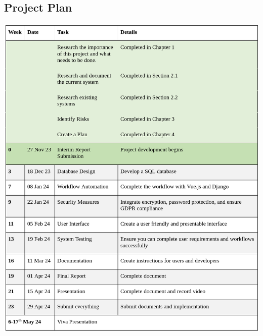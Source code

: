 \begin{appendices}
\section{Project Plan}
\includegraphics[width=\textwidth]{images/project-plan.png}


\end{appendices}
